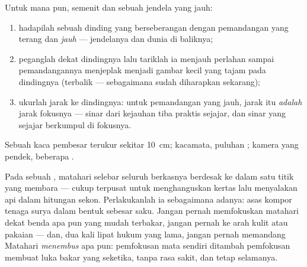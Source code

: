 \begin{method}\label{met:g8:lenses-images:measure}
Untuk  mana pun, semenit dan sebuah jendela yang jauh:
\begin{enumerate}
  \item hadapilah sebuah dinding yang berseberangan dengan pemandangan
        yang terang dan \emph{jauh} --- jendelanya dan dunia di
        baliknya;
  \item peganglah  dekat dindingnya lalu tariklah ia menjauh
        perlahan sampai pemandangannya menjeplak menjadi gambar kecil
        yang tajam pada dindingnya (terbalik --- sebagaimana sudah
        diharapkan sekarang);
  \item ukurlah jarak  ke dindingnya: untuk pemandangan yang
        jauh, jarak itu \emph{adalah} jarak fokusnya --- sinar dari kejauhan tiba
        praktis sejajar, dan sinar yang sejajar berkumpul di fokusnya.
\end{enumerate}
Sebuah kaca pembesar terukur sekitar \qty{10}{cm};  kacamata,
puluhan ;  kamera yang pendek, beberapa .
\end{method}

\begin{remark}\label{rem:g8:lenses-images:burning}
Pada  sebuah ,  matahari selebar seluruh
berkasnya berdesak ke dalam satu titik yang membara --- cukup terpusat
untuk menghanguskan kertas lalu menyalakan api dalam hitungan sekon.
Perlakukanlah ia sebagaimana adanya: asas kompor tenaga surya dalam
bentuk sebesar saku. Jangan pernah memfokuskan  matahari dekat
benda apa pun yang mudah terbakar, jangan pernah ke arah kulit atau
pakaian --- dan, dua kali lipat hukum yang lama, jangan pernah
memandang Matahari \emph{menembus}  apa pun: pemfokusan mata
sendiri ditambah pemfokusan  membuat luka bakar yang seketika,
tanpa rasa sakit, dan tetap selamanya.
\end{remark}

